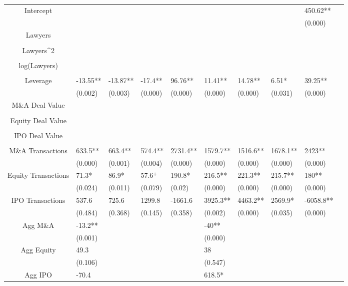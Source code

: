 \documentclass{article}
\begin{document}
\begin{table}[H]
\begin{tabular}{|clllllllll|}
Intercept &  &  &  &  &  &  &  & 450.62** & \\ 
   &  &  &  &  &  &  &  & (0.000) & \\ 
  Lawyers &  &  &  &  &  &  &  &  & \\ 
   &  &  &  &  &  &  &  &  & \\ 
  Lawyers^2 &  &  &  &  &  &  &  &  & \\ 
   &  &  &  &  &  &  &  &  & \\ 
  log(Lawyers) &  &  &  &  &  &  &  &  & \\ 
   &  &  &  &  &  &  &  &  & \\ 
  Leverage & -13.55** & -13.87** & -17.4** & 96.76** & 11.41** & 14.78** & 6.51* & 39.25** & \\ 
   & (0.002) & (0.003) & (0.000) & (0.000) & (0.000) & (0.000) & (0.031) & (0.000) & \\ 
  M\&A Deal Value &  &  &  &  &  &  &  &  & \\ 
   &  &  &  &  &  &  &  &  & \\ 
  Equity Deal Value &  &  &  &  &  &  &  &  & \\ 
   &  &  &  &  &  &  &  &  & \\ 
  IPO Deal Value &  &  &  &  &  &  &  &  & \\ 
   &  &  &  &  &  &  &  &  & \\ 
  M\&A Transactions & 633.5** & 663.4** & 574.4** & 2731.4** & 1579.7** & 1516.6** & 1678.1** & 2423** & \\ 
   & (0.000) & (0.001) & (0.004) & (0.000) & (0.000) & (0.000) & (0.000) & (0.000) & \\ 
  Equity Transactions & 71.3* & 86.9* & 57.6$^{+}$ & 190.8* & 216.5** & 221.3** & 215.7** & 180** & \\ 
   & (0.024) & (0.011) & (0.079) & (0.02) & (0.000) & (0.000) & (0.000) & (0.000) & \\ 
  IPO Transactions & 537.6 & 725.6 & 1299.8 & -1661.6 & 3925.3** & 4463.2** & 2569.9* & -6058.8** & \\ 
   & (0.484) & (0.368) & (0.145) & (0.358) & (0.002) & (0.000) & (0.035) & (0.000) & \\ 
  Agg M\&A & -13.2** &  &  &  & -40** &  &  &  & \\ 
   & (0.001) &  &  &  & (0.000) &  &  &  & \\ 
  Agg Equity & 49.3 &  &  &  & 38 &  &  &  & \\ 
   & (0.106) &  &  &  & (0.547) &  &  &  & \\ 
  Agg IPO & -70.4 &  &  &  & 618.5* &  &  &  & \\ 

\end{tabular}
\end{table}
\end{document}
